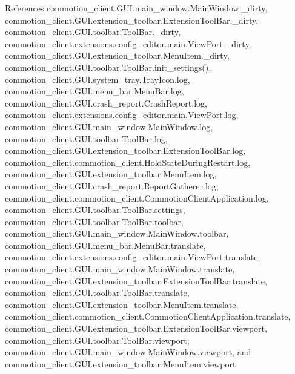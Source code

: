 References commotion\+\_\+client.\+G\+U\+I.\+main\+\_\+window.\+Main\+Window.\+\_\+dirty, commotion\+\_\+client.\+G\+U\+I.\+extension\+\_\+toolbar.\+Extension\+Tool\+Bar.\+\_\+dirty, commotion\+\_\+client.\+G\+U\+I.\+toolbar.\+Tool\+Bar.\+\_\+dirty, commotion\+\_\+client.\+extensions.\+config\+\_\+editor.\+main.\+View\+Port.\+\_\+dirty, commotion\+\_\+client.\+G\+U\+I.\+extension\+\_\+toolbar.\+Menu\+Item.\+\_\+dirty, commotion\+\_\+client.\+G\+U\+I.\+toolbar.\+Tool\+Bar.\+init\+\_\+settings(), commotion\+\_\+client.\+G\+U\+I.\+system\+\_\+tray.\+Tray\+Icon.\+log, commotion\+\_\+client.\+G\+U\+I.\+menu\+\_\+bar.\+Menu\+Bar.\+log, commotion\+\_\+client.\+G\+U\+I.\+crash\+\_\+report.\+Crash\+Report.\+log, commotion\+\_\+client.\+extensions.\+config\+\_\+editor.\+main.\+View\+Port.\+log, commotion\+\_\+client.\+G\+U\+I.\+main\+\_\+window.\+Main\+Window.\+log, commotion\+\_\+client.\+G\+U\+I.\+toolbar.\+Tool\+Bar.\+log, commotion\+\_\+client.\+G\+U\+I.\+extension\+\_\+toolbar.\+Extension\+Tool\+Bar.\+log, commotion\+\_\+client.\+commotion\+\_\+client.\+Hold\+State\+During\+Restart.\+log, commotion\+\_\+client.\+G\+U\+I.\+extension\+\_\+toolbar.\+Menu\+Item.\+log, commotion\+\_\+client.\+G\+U\+I.\+crash\+\_\+report.\+Report\+Gatherer.\+log, commotion\+\_\+client.\+commotion\+\_\+client.\+Commotion\+Client\+Application.\+log, commotion\+\_\+client.\+G\+U\+I.\+toolbar.\+Tool\+Bar.\+settings, commotion\+\_\+client.\+G\+U\+I.\+toolbar.\+Tool\+Bar.\+toolbar, commotion\+\_\+client.\+G\+U\+I.\+main\+\_\+window.\+Main\+Window.\+toolbar, commotion\+\_\+client.\+G\+U\+I.\+menu\+\_\+bar.\+Menu\+Bar.\+translate, commotion\+\_\+client.\+extensions.\+config\+\_\+editor.\+main.\+View\+Port.\+translate, commotion\+\_\+client.\+G\+U\+I.\+main\+\_\+window.\+Main\+Window.\+translate, commotion\+\_\+client.\+G\+U\+I.\+extension\+\_\+toolbar.\+Extension\+Tool\+Bar.\+translate, commotion\+\_\+client.\+G\+U\+I.\+toolbar.\+Tool\+Bar.\+translate, commotion\+\_\+client.\+G\+U\+I.\+extension\+\_\+toolbar.\+Menu\+Item.\+translate, commotion\+\_\+client.\+commotion\+\_\+client.\+Commotion\+Client\+Application.\+translate, commotion\+\_\+client.\+G\+U\+I.\+extension\+\_\+toolbar.\+Extension\+Tool\+Bar.\+viewport, commotion\+\_\+client.\+G\+U\+I.\+toolbar.\+Tool\+Bar.\+viewport, commotion\+\_\+client.\+G\+U\+I.\+main\+\_\+window.\+Main\+Window.\+viewport, and commotion\+\_\+client.\+G\+U\+I.\+extension\+\_\+toolbar.\+Menu\+Item.\+viewport.


